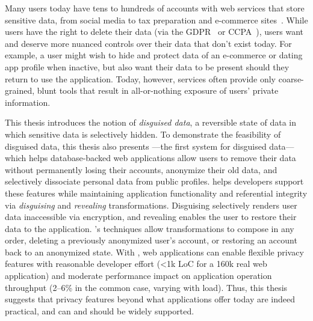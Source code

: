 Many users today have tens to hundreds of accounts with web services that store
sensitive data, from social media to tax preparation and e-commerce
sites~\cite{tens,hundreds,password_life_cycle}.
%
While users have the right to delete their data (via \eg the
GDPR~\cite{eu:gdpr} or CCPA~\cite{ccpa}), users want and deserve more nuanced
controls over their data that don't exist today.
%
For example, a user might wish to hide
and protect data of an e-commerce or dating app profile when inactive, but also
want their data to be present should they return to use the application. 
%
Today, however, services often provide only coarse-grained, blunt tools that
result in all-or-nothing exposure of users’ private information.
%

%
This thesis introduces the notion of \emph{disguised data}, a reversible state
of data in which sensitive data is selectively hidden.
%
To demonstrate the feasibility of disguised data, this thesis also presents
\sys---the first system for disguised data---which helps database-backed web applications allow users
to remove their data without permanently losing their accounts, anonymize their
old data, and selectively dissociate personal data from public profiles.
%
\sys helps developers support these features while maintaining application
functionality and referential integrity via \emph{disguising} and
\emph{revealing} transformations.
%
Disguising selectively renders user data inaccessible via encryption, and
revealing enables the user to restore their data to the application.
%
\sys's techniques allow transformations to compose in any order, \eg deleting a
previously anonymized user's account, or restoring an account back to an
anonymized state.
%
With \sys, web applications can enable flexible privacy features with reasonable
developer effort (<1k LoC for a 160k real web application) and moderate
performance impact on application operation throughput (2--6\% in the common
case, varying with load).  
%
Thus, this thesis suggests that privacy features beyond what applications offer
today are indeed practical, and can and should be widely supported.
%
